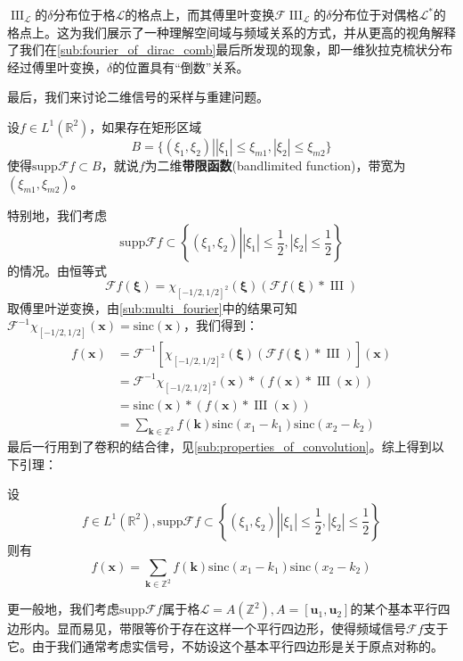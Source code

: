 \documentclass{ctexbook}
\newcommand{\shah}{\operatorname{III}}
\begin{document}
$\shah_{\mathcal{L} }$的$\delta$分布位于格$\mathcal{L} $的格点上，而其傅里叶变换$\mathcal{F} \shah_{\mathcal{L} }$的$\delta$分布位于对偶格$\mathcal{L} ^*$的格点上。这为我们展示了一种理解空间域与频域关系的方式，并从更高的视角解释了我们在\ref{sub:fourier_of_dirac_comb}最后所发现的现象，即一维狄拉克梳状分布经过傅里叶变换，$\delta$的位置具有“倒数”关系。

最后，我们来讨论二维信号的采样与重建问题。
\begin{definition}[二维带限函数]
    设$f\in L^1(\mathbb{R}^2)$，如果存在矩形区域$$B=\{( \xi_1,\xi_2)\left| |\xi_1|\leq \xi_{m1},|\xi_2|\leq \xi_{m2}\right.\}$$
    使得$\text{supp} \mathcal{F}f \subset B$，就说$f$为二维\textbf{带限函数}(bandlimited function)，带宽为$(\xi_{m1},\xi_{m2})$。
\end{definition}
特别地，我们考虑
$$\text{supp}\mathcal{F} f\subset\left\{( \xi_1,\xi_2)\left| |\xi_1|\leq \dfrac{1}{2},|\xi_2|\leq \dfrac{1}{2}\right.\right\}$$
的情况。由恒等式
\[\mathcal{F} f(\boldsymbol{\xi})=\chi_{[-1/2,1/2]^2}(\boldsymbol{\xi})(\mathcal{F} f(\boldsymbol{\xi})*\shah)\]
取傅里叶逆变换，由\ref{sub:multi_fourier}中的结果可知$\mathcal{F} ^{-1}\chi_{[-1/2,1/2]}(\mathbf{x})=\text{sinc}(\mathbf{x})$，我们得到：\begin{align*}
    f(\mathbf{x})&=\mathcal{F} ^{-1}[\chi_{[-1/2,1/2]^2}(\boldsymbol{\xi})(\mathcal{F} f(\boldsymbol{\xi})*\shah)](\mathbf{x})\\
    &=\mathcal{F} ^{-1}\chi_{[-1/2,1/2]^2}(\mathbf{x})*(f(\mathbf{x})*\shah(\mathbf{x}))\\
    &=\text{sinc}(\mathbf{x})*(f(\mathbf{x})*\shah(\mathbf{x}))\\
    &=\sum_{\mathbf{k}\in\mathbb{Z}^2}f(\mathbf{k})\text{sinc}(x_1-k_1)\text{sinc}(x_2-k_2)
\end{align*}
最后一行用到了卷积的结合律，见\ref{sub:properties_of_convolution}。综上得到以下引理：
\begin{lemma}[方形采样公式]
    设$$f\in L^1(\mathbb{R}^2),\text{supp}\mathcal{F} f\subset\left\{( \xi_1,\xi_2)\left| |\xi_1|\leq \dfrac{1}{2},|\xi_2|\leq \dfrac{1}{2}\right.\right\}$$
    则有
    \[f(\mathbf{x})=\sum_{\mathbf{k}\in\mathbb{Z}^2}f(\mathbf{k})\text{sinc}(x_1-k_1)\text{sinc}(x_2-k_2)\]
\end{lemma}

更一般地，我们考虑$\text{supp}\mathcal{F} f$属于格$\mathcal{L} =A(\mathbb{Z}^2),A=[\mathbf{u}_1,\mathbf{u}_2]$的某个基本平行四边形内。显而易见，带限等价于存在这样一个平行四边形，使得频域信号$\mathcal{F} f$支于它。由于我们通常考虑实信号，不妨设这个基本平行四边形是关于原点对称的。
\end{document}
